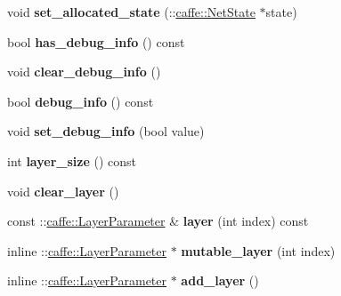 \begin{DoxyCompactItemize}
void {\bfseries set\+\_\+allocated\+\_\+state} (\+::\mbox{\hyperlink{classcaffe_1_1_net_state}{caffe\+::\+Net\+State}} $\ast$state)
\item 
\mbox{\label{classcaffe_1_1_net_parameter_a455205e09df9bd144592cfc5de5ba1cd}} 
bool {\bfseries has\+\_\+debug\+\_\+info} () const
\item 
\mbox{\label{classcaffe_1_1_net_parameter_adc68870d5c5327b3f522351fd25155c8}} 
void {\bfseries clear\+\_\+debug\+\_\+info} ()
\item 
\mbox{\label{classcaffe_1_1_net_parameter_a871d961e8fd5c66ffd2d0096e531514b}} 
bool {\bfseries debug\+\_\+info} () const
\item 
\mbox{\label{classcaffe_1_1_net_parameter_a863aa795a120330d8c9623034924d699}} 
void {\bfseries set\+\_\+debug\+\_\+info} (bool value)
\item 
\mbox{\label{classcaffe_1_1_net_parameter_a2844a228a98d98a1cc05b01f37488286}} 
int {\bfseries layer\+\_\+size} () const
\item 
\mbox{\label{classcaffe_1_1_net_parameter_a3059f187a93e0378f345a4f5a7920f6e}} 
void {\bfseries clear\+\_\+layer} ()
\item 
\mbox{\label{classcaffe_1_1_net_parameter_a5287cbf652f3371ff504228e1364b923}} 
const \+::\mbox{\hyperlink{classcaffe_1_1_layer_parameter}{caffe\+::\+Layer\+Parameter}} \& {\bfseries layer} (int index) const
\item 
\mbox{\label{classcaffe_1_1_net_parameter_aace101de188aa072b313a89a1354e3e0}} 
inline \+::\mbox{\hyperlink{classcaffe_1_1_layer_parameter}{caffe\+::\+Layer\+Parameter}} $\ast$ {\bfseries mutable\+\_\+layer} (int index)
\item 
\mbox{\label{classcaffe_1_1_net_parameter_a76191a5f82e41286bd0220eca9db98a3}} 
inline \+::\mbox{\hyperlink{classcaffe_1_1_layer_parameter}{caffe\+::\+Layer\+Parameter}} $\ast$ {\bfseries add\+\_\+layer} ()

\end{DoxyCompactItemize}
